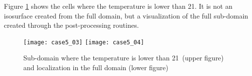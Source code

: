 Figure \ref{fige4_e5} shows the cells where the temperature
is lower than 21\degresC. It is not an isosurface created from the full domain,
but a visualization of the full sub-domain created through the post-processing
routines.

\begin{figure}[h!]
\begin{center}
\texttt{[image: case5\_03]}
\texttt{[image: case5\_04]}
\caption{Sub-domain where the temperature is lower than 21\degresC\ (upper figure)
and localization in the full domain (lower figure)}
\label{fige4_e5}
\end{center}
\end{figure}
